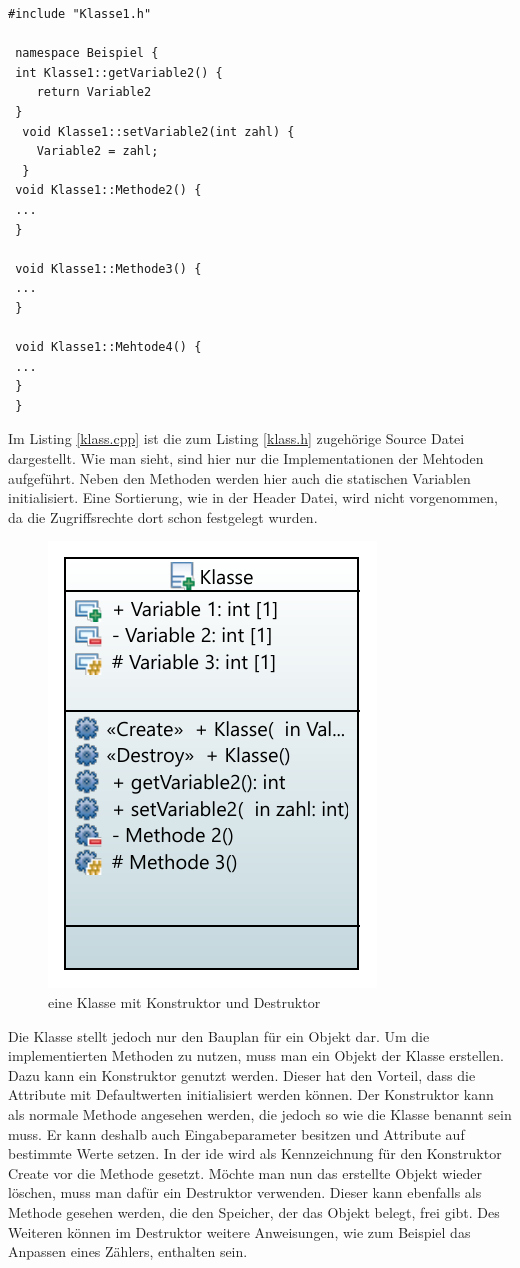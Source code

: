  \begin{lstlisting}[caption = Klasse.cpp,label=klass.cpp]
 #include "Klasse1.h"
 
 namespace Beispiel {
 int Klasse1::getVariable2() {
 	return Variable2
 }
  void Klasse1::setVariable2(int zahl) {
  	Variable2 = zahl;
  }
 void Klasse1::Methode2() {
 ...
 }
  
 void Klasse1::Methode3() {
 ...
 }
   
 void Klasse1::Mehtode4() {
 ...
 }
 }
 \end{lstlisting}
 Im Listing \ref{klass.cpp} ist die zum Listing \ref{klass.h} zugehörige Source Datei dargestellt. Wie man sieht, sind hier nur die Implementationen der Mehtoden aufgeführt. Neben den Methoden werden hier auch die statischen Variablen initialisiert. Eine Sortierung, wie in der Header Datei, wird nicht vorgenommen, da  die Zugriffsrechte dort schon festgelegt wurden. 
  \begin{figure}[H]
  	\centering
  	  	\includegraphics[scale=1.2]{bilder/pdfvorlagen/model2}
  	\caption[eine Klasse mit Konstruktor und Destruktor]{eine Klasse mit Konstruktor und Destruktor}
  	\label{fig:klasseKonstr}
  \end{figure}
Die Klasse stellt jedoch nur den Bauplan für ein Objekt dar. Um die implementierten Methoden zu nutzen, muss man ein Objekt der Klasse erstellen. Dazu kann ein \glqq Konstruktor\grqq{} genutzt werden. Dieser hat den Vorteil, dass die Attribute mit Defaultwerten initialisiert werden können. Der \glqq Konstruktor\grqq{} kann als normale Methode angesehen werden, die jedoch so wie die Klasse benannt sein muss. Er kann deshalb auch Eingabeparameter besitzen und Attribute auf bestimmte Werte setzen. In der \ac{ide} wird als Kennzeichnung für den Konstruktor \glqq Create\grqq{} vor die Methode gesetzt. Möchte man nun das erstellte Objekt wieder löschen, muss man dafür ein  \glqq Destruktor\grqq{} verwenden. Dieser kann ebenfalls als Methode gesehen werden, die den Speicher, der das Objekt belegt, frei gibt. Des Weiteren können im  \glqq Destruktor\grqq{} weitere Anweisungen, wie zum Beispiel das Anpassen eines Zählers, enthalten sein.\\
